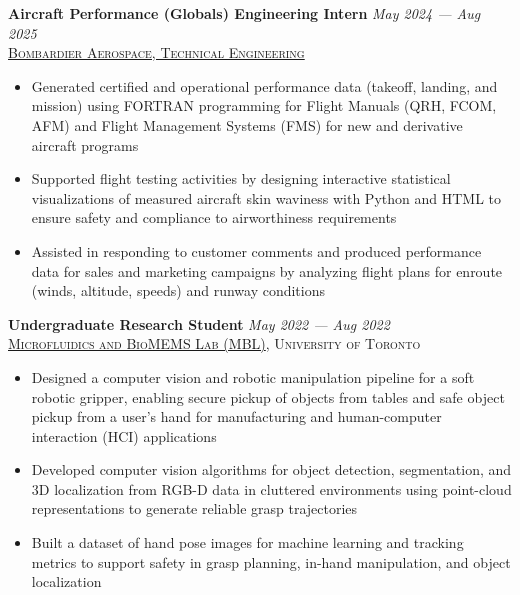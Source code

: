 \documentclass[letterpaper, 10pt]{article}
\newcommand{\vspa}{\vspace{0.1cm}}
\begin{document}
	\vspa
	
	\textbf{Aircraft Performance (Globals) Engineering Intern} \hfill \textit{May 2024 --- Aug 2025} \\
	\textsc{\href{https://bombardier.com/en}{Bombardier Aerospace, Technical Engineering}}
	\begin{itemize}		
		\item Generated certified and operational performance data (takeoff, landing, and mission) using FORTRAN programming for Flight Manuals (QRH, FCOM, AFM) and Flight Management Systems (FMS) for new and derivative aircraft programs
		
		\item Supported flight testing activities by designing interactive statistical visualizations of measured aircraft skin waviness with Python and HTML to ensure safety and compliance to airworthiness requirements
		
		\item Assisted in responding to customer comments and produced performance data for sales and marketing campaigns by analyzing flight plans for enroute (winds, altitude, speeds) and runway conditions
	\end{itemize}
	
	\vspa
	
	\textbf{Undergraduate Research Student} \hfill \textit{May 2022 --- Aug 2022} \\
	\textsc{\href{https://liulab.mie.utoronto.ca/}{Microfluidics and BioMEMS Lab (MBL)}, University of Toronto}
	\begin{itemize}
		\item Designed a computer vision and robotic manipulation pipeline for a soft robotic gripper, enabling secure pickup of objects from tables and safe object pickup from a user's hand for manufacturing and human-computer interaction (HCI) applications
		
		\item Developed computer vision algorithms for object detection, segmentation, and 3D localization from RGB-D data in cluttered environments using point-cloud representations to generate reliable grasp trajectories
		
		\item Built a dataset of hand pose images for machine learning and tracking metrics to support safety in grasp planning, in-hand manipulation, and object localization
	\end{itemize}
	
	
\end{document}
